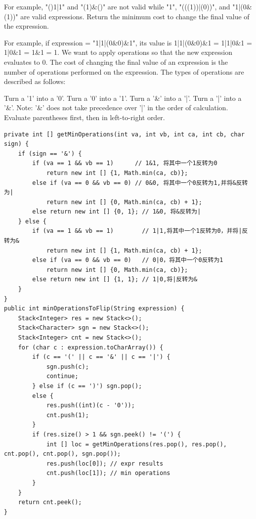 \documentclass[9pt, b5paaper]{book}
\begin{document}
For example, "()1|1" and "(1)\&()" are not valid while "1", "(((1))|(0))", and "1|(0\&(1))" are valid expressions.
Return the minimum cost to change the final value of the expression.

For example, if expression = "1|1|(0\&0)\&1", its value is 1|1|(0\&0)\&1 = 1|1|0\&1 = 1|0\&1 = 1\&1 = 1. We want to apply operations so that the new expression evaluates to 0.
The cost of changing the final value of an expression is the number of operations performed on the expression. The types of operations are described as follows:

Turn a '1' into a '0'.
Turn a '0' into a '1'.
Turn a '\&' into a '|'.
Turn a '|' into a '\&'.
Note: '\&' does not take precedence over '|' in the order of calculation. Evaluate parentheses first, then in left-to-right order.
\begin{verbatim}
private int [] getMinOperations(int va, int vb, int ca, int cb, char sign) {
    if (sign == '&') {
        if (va == 1 && vb == 1)      // 1&1, 将其中一个1反转为0
            return new int [] {1, Math.min(ca, cb)};
        else if (va == 0 && vb == 0) // 0&0, 将其中一个0反转为1,并将&反转为|
            return new int [] {0, Math.min(ca, cb) + 1};
        else return new int [] {0, 1}; // 1&0, 将&反转为|
    } else {
        if (va == 1 && vb == 1)        // 1|1,将其中一个1反转为0，并将|反转为&
            return new int [] {1, Math.min(ca, cb) + 1};
        else if (va == 0 && vb == 0)   // 0|0，将其中一个0反转为1
            return new int [] {0, Math.min(ca, cb)};
        else return new int [] {1, 1}; // 1|0,将|反转为&
    }
}
public int minOperationsToFlip(String expression) {
    Stack<Integer> res = new Stack<>();
    Stack<Character> sgn = new Stack<>();
    Stack<Integer> cnt = new Stack<>();
    for (char c : expression.toCharArray()) {
        if (c == '(' || c == '&' || c == '|') {
            sgn.push(c);
            continue;
        } else if (c == ')') sgn.pop();
        else {
            res.push((int)(c - '0'));
            cnt.push(1);
        }
        if (res.size() > 1 && sgn.peek() != '(') {
            int [] loc = getMinOperations(res.pop(), res.pop(), cnt.pop(), cnt.pop(), sgn.pop());
            res.push(loc[0]); // expr results
            cnt.push(loc[1]); // min operations
        }
    }
    return cnt.peek();
}
\end{verbatim}
\end{document}
